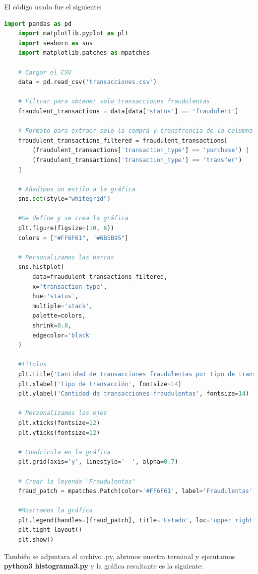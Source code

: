 \documentclass{article}
\begin{document}
\begin{itemize}
    El código usado fue el siguiente:

    \begin{lstlisting}[language=Python, caption=Implementación histograma del tipo de transacción y el estado de la transacción fraudolenta.]
    import pandas as pd
    import matplotlib.pyplot as plt
    import seaborn as sns
    import matplotlib.patches as mpatches

    # Cargar el CSV
    data = pd.read_csv('transacciones.csv')

    # Filtrar para obtener solo transacciones fraudulentas
    fraudulent_transactions = data[data['status'] == 'fraudulent']

    # Formato para extraer solo la compra y transfrencia de la columna 'purchase' y 'transfer'
    fraudulent_transactions_filtered = fraudulent_transactions[
        (fraudulent_transactions['transaction_type'] == 'purchase') | 
        (fraudulent_transactions['transaction_type'] == 'transfer')
    ]

    # Añadimos un estilo a la gráfica
    sns.set(style="whitegrid")

    #Se define y se crea la gráfica
    plt.figure(figsize=(10, 6)) 
    colors = ["#FF6F61", "#6B5B95"]

    # Personalizamos las barras
    sns.histplot(
        data=fraudulent_transactions_filtered, 
        x='transaction_type', 
        hue='status', 
        multiple='stack', 
        palette=colors,
        shrink=0.8,  
        edgecolor='black'  
    )

    #Titulos
    plt.title('Cantidad de transacciones fraudulentas por tipo de transacción', fontsize=16, fontweight='bold')
    plt.xlabel('Tipo de transacción', fontsize=14)
    plt.ylabel('Cantidad de transacciones fraudulentas', fontsize=14)

    # Perzonalizamos los ejes
    plt.xticks(fontsize=12)
    plt.yticks(fontsize=12)

    # Cuadrícula en la gráfica 
    plt.grid(axis='y', linestyle='--', alpha=0.7)

    # Crear la leyenda "Fraudulentas"
    fraud_patch = mpatches.Patch(color='#FF6F61', label='Fraudulentas')

    #Mostramos la gráfica
    plt.legend(handles=[fraud_patch], title='Estado', loc='upper right', fontsize=12)
    plt.tight_layout()
    plt.show()
    \end{lstlisting}

    También se adjuntara el archivo .py, abrimos nuestra terminal y ejecutamos \textbf{python3 histograma3.py} y la gráfica resultante es la siguiente:


\end{itemize}
\end{document}
